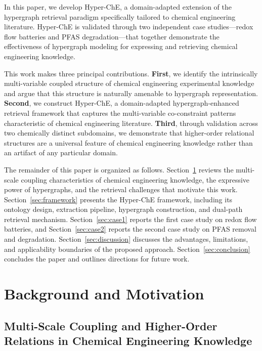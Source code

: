 \documentclass[11pt,a4paper]{article}
\begin{document}
In this paper, we develop Hyper-ChE, a domain-adapted extension of the hypergraph retrieval paradigm specifically tailored to chemical engineering literature. Hyper-ChE is validated through two independent case studies---redox flow batteries and PFAS degradation---that together demonstrate the effectiveness of hypergraph modeling for expressing and retrieving chemical engineering knowledge.

This work makes three principal contributions. \textbf{First}, we identify the intrinsically multi-variable coupled structure of chemical engineering experimental knowledge and argue that this structure is naturally amenable to hypergraph representation. \textbf{Second}, we construct Hyper-ChE, a domain-adapted hypergraph-enhanced retrieval framework that captures the multi-variable co-constraint patterns characteristic of chemical engineering literature. \textbf{Third}, through validation across two chemically distinct subdomains, we demonstrate that higher-order relational structures are a universal feature of chemical engineering knowledge rather than an artifact of any particular domain.

The remainder of this paper is organized as follows. Section~\ref{sec:background} reviews the multi-scale coupling characteristics of chemical engineering knowledge, the expressive power of hypergraphs, and the retrieval challenges that motivate this work. Section~\ref{sec:framework} presents the Hyper-ChE framework, including its ontology design, extraction pipeline, hypergraph construction, and dual-path retrieval mechanism. Section~\ref{sec:case1} reports the first case study on redox flow batteries, and Section~\ref{sec:case2} reports the second case study on PFAS removal and degradation. Section~\ref{sec:discussion} discusses the advantages, limitations, and applicability boundaries of the proposed approach. Section~\ref{sec:conclusion} concludes the paper and outlines directions for future work.


\section{Background and Motivation}
\label{sec:background}

\subsection{Multi-Scale Coupling and Higher-Order Relations in Chemical Engineering Knowledge}
\label{subsec:multiscale}
\end{document}
